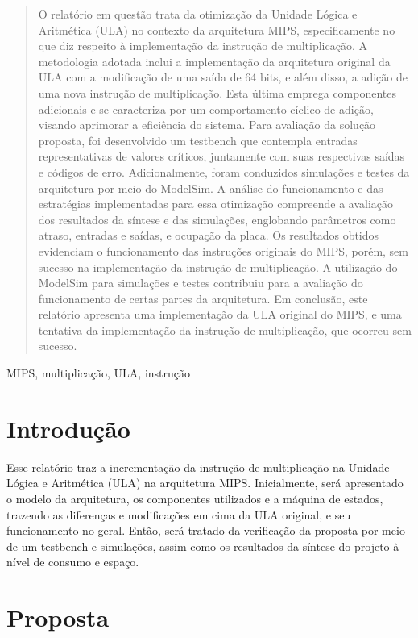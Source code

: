 \documentclass[conference]{IEEEtran}
\begin{document}
\begin{abstract}
O relatório em questão trata da otimização da Unidade Lógica e Aritmética (ULA) no contexto da arquitetura MIPS, especificamente no que diz respeito à implementação da instrução de multiplicação. A metodologia adotada inclui a implementação da arquitetura original da ULA com a modificação de uma saída de 64 bits, e além disso, a adição de uma nova instrução de multiplicação. Esta última emprega componentes adicionais e se caracteriza por um comportamento cíclico de adição, visando aprimorar a eficiência do sistema. Para avaliação da solução proposta, foi desenvolvido um testbench que contempla entradas representativas de valores críticos, juntamente com suas respectivas saídas e códigos de erro. Adicionalmente, foram conduzidos simulações e testes da arquitetura por meio do ModelSim. A análise do funcionamento e das estratégias implementadas para essa otimização compreende a avaliação dos resultados da síntese e das simulações, englobando parâmetros como atraso, entradas e saídas, e ocupação da placa. Os resultados obtidos evidenciam o funcionamento das instruções originais do MIPS, porém, sem sucesso na implementação da instrução de multiplicação. A utilização do ModelSim para simulações e testes contribuiu para a avaliação do funcionamento de certas partes da arquitetura. Em conclusão, este relatório apresenta uma implementação da ULA original do MIPS, e uma tentativa da implementação da instrução de multiplicação, que ocorreu sem sucesso.

\end{abstract}

\begin{IEEEkeywords}
MIPS, multiplicação, ULA, instrução
\end{IEEEkeywords}

\section{Introdução}
Esse relatório traz a incrementação da instrução de multiplicação na Unidade Lógica e Aritmética (ULA) na arquitetura MIPS. Inicialmente, será apresentado o modelo da arquitetura, os componentes utilizados e a máquina de estados, trazendo as diferenças e modificações em cima da ULA original, e seu funcionamento no geral. Então, será tratado da verificação da proposta por meio de um testbench e simulações, assim como os resultados da síntese do projeto à nível de consumo e espaço. 

\section{Proposta}
\end{document}
